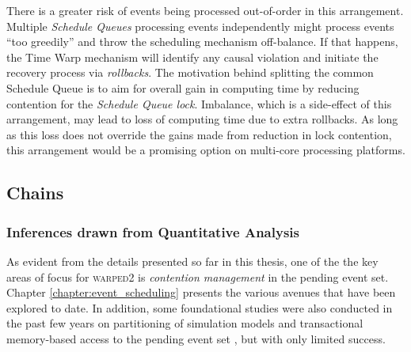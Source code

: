 \documentclass[11pt]{book}
\begin{document}
There is a greater risk of events being processed out-of-order in this arrangement.  Multiple \emph{Schedule
  Queues} processing events independently might process events ``too greedily'' and throw the scheduling
mechanism off-balance.  If that happens, the Time Warp mechanism will identify any causal violation and
initiate the recovery process via \emph{rollbacks}.  The motivation behind splitting the common Schedule Queue
is to aim for overall gain in computing time by reducing contention for the \emph{Schedule Queue lock}.
Imbalance, which is a side-effect of this arrangement, may lead to loss of computing time due to extra
rollbacks.  As long as this loss does not override the gains made from reduction in lock contention, this
arrangement would be a promising option on multi-core processing platforms.

\subsection{Chains}\label{subsec:chains}

\subsubsection{Inferences drawn from Quantitative Analysis}\label{subsubsec:inferences}

As evident from the details presented so far in this thesis, one of the the key areas of focus for
\textsc{warped2} is \emph{contention management} in the pending event set.  Chapter
\ref{chapter:event_scheduling} presents the various avenues that have been explored to date.  In addition,
some foundational studies were also conducted in the past few years on partitioning of simulation models
\cite{alt-14} and transactional memory-based access to the pending event set \cite{hay-15}, but with only
limited success.
\end{document}
